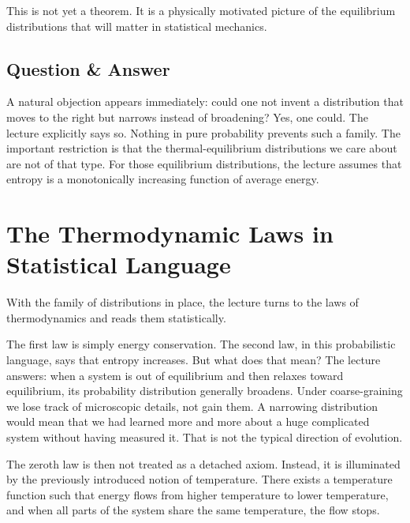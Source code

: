 This is not yet a theorem. It is a physically motivated picture of the equilibrium distributions that will matter in statistical mechanics.

\subsection{Question \& Answer}

A natural objection appears immediately: could one not invent a distribution that moves to the right but narrows instead of broadening? Yes, one could. The lecture explicitly says so. Nothing in pure probability prevents such a family. The important restriction is that the thermal-equilibrium distributions we care about are not of that type. For those equilibrium distributions, the lecture assumes that entropy is a monotonically increasing function of average energy.

\section{The Thermodynamic Laws in Statistical Language}

With the family of distributions in place, the lecture turns to the laws of thermodynamics and reads them statistically.

The first law is simply energy conservation. The second law, in this probabilistic language, says that entropy increases. But what does that mean? The lecture answers: when a system is out of equilibrium and then relaxes toward equilibrium, its probability distribution generally broadens. Under coarse-graining we lose track of microscopic details, not gain them. A narrowing distribution would mean that we had learned more and more about a huge complicated system without having measured it. That is not the typical direction of evolution.

The zeroth law is then not treated as a detached axiom. Instead, it is illuminated by the previously introduced notion of temperature. There exists a temperature function such that energy flows from higher temperature to lower temperature, and when all parts of the system share the same temperature, the flow stops.


